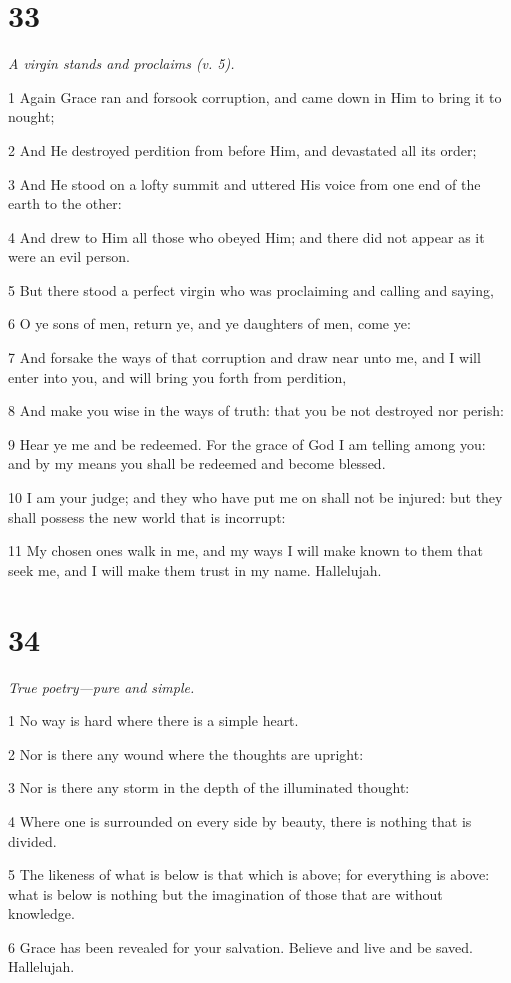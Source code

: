 \chapter{33}

\par \textit{A virgin stands and proclaims (v. 5).}

\par 1 Again Grace ran and forsook corruption, and came down in Him to bring it to nought;
\par 2 And He destroyed perdition from before Him, and devastated all its order;
\par 3 And He stood on a lofty summit and uttered His voice from one end of the earth to the other:
\par 4 And drew to Him all those who obeyed Him; and there did not appear as it were an evil person.
\par 5 But there stood a perfect virgin who was proclaiming and calling and saying,
\par 6 O ye sons of men, return ye, and ye daughters of men, come ye:
\par 7 And forsake the ways of that corruption and draw near unto me, and I will enter into you, and will bring you forth from perdition,
\par 8 And make you wise in the ways of truth: that you be not destroyed nor perish:
\par 9 Hear ye me and be redeemed. For the grace of God I am telling among you: and by my means you shall be redeemed and become blessed.
\par 10 I am your judge; and they who have put me on shall not be injured: but they shall possess the new world that is incorrupt:
\par 11 My chosen ones walk in me, and my ways I will make known to them that seek me, and I will make them trust in my name. Hallelujah.



\chapter{34}

\par \textit{True poetry—pure and simple.}

\par 1 No way is hard where there is a simple heart.
\par 2 Nor is there any wound where the thoughts are upright:
\par 3 Nor is there any storm in the depth of the illuminated thought:
\par 4 Where one is surrounded on every side by beauty, there is nothing that is divided.
\par 5 The likeness of what is below is that which is above; for everything is above: what is below is nothing but the imagination of those that are without knowledge.
\par 6 Grace has been revealed for your salvation. Believe and live and be saved. Hallelujah.

